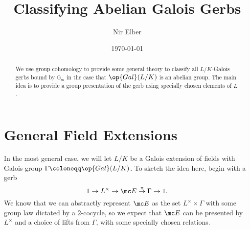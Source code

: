 \documentclass{article}
\title{Classifying Abelian Galois Gerbs}
\author{Nir Elber}
\date{\today}
\numberwithin{equation}{section}
\begin{document}
\maketitle

\begin{abstract}
	\noindent We use group cohomology to provide some general theory to classify all $L/K$-Galois gerbs bound by $\mathbb G_m$ in the case that $\op{Gal}(L/K)$ is an abelian group. The main idea is to provide a group presentation of the gerb using specially chosen elements of $L$.
\end{abstract}

\setcounter{tocdepth}{4}
\tableofcontents

\section{General Field Extensions} \label{sec:general}
In the most general case, we will let $L/K$ be a Galois extension of fields with Galois group $\Gamma\coloneqq\op{Gal}(L/K)$. To sketch the idea here, begin with a gerb
\[1\to L^\times\to\mc E\stackrel\pi\to\Gamma\to1.\]
We know that we can abstractly represent $\mc E$ as the set $L^\times\times\Gamma$ with some group law dictated by a $2$-cocycle, so we expect that $\mc E$ can be presented by $L^\times$ and a choice of lifts from $\Gamma$, with some specially chosen relations.
\end{document}
